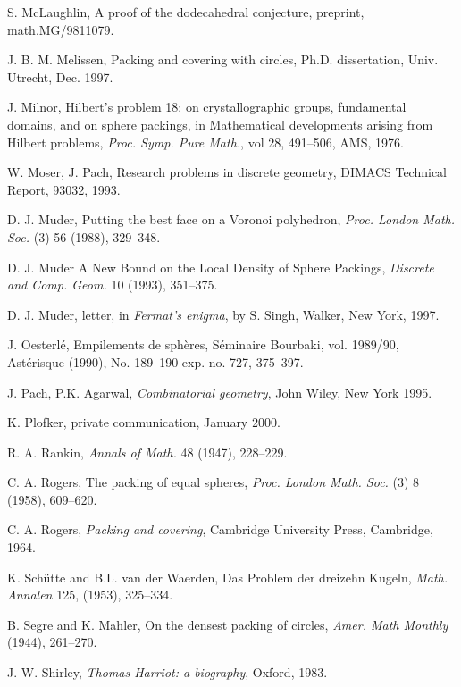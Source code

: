  S. McLaughlin, A proof of the dodecahedral conjecture,
    preprint, math.MG/9811079.

 J. B. M. Melissen, Packing and covering with circles,
    Ph.D. dissertation, Univ. Utrecht, Dec. 1997.

 J. Milnor, Hilbert's problem 18: on crystallographic groups,
    fundamental domains, and on sphere packings, in
    Mathematical developments arising from Hilbert problems,
    {\it Proc. Symp. Pure Math.}, vol 28, 491--506, AMS, 1976.

 W. Moser, J. Pach, Research problems in discrete geometry,
    DIMACS Technical Report, 93032, 1993.

 D. J. Muder, Putting the best face on a Voronoi polyhedron,
    {\it Proc. London Math. Soc.} (3) 56 (1988), 329--348.


  D. J. Muder A New Bound on the Local Density
of Sphere Packings, {\it Discrete and Comp. Geom.} 10 (1993),
351--375.

  D. J. Muder, letter, in {\it Fermat's enigma}, by S. Singh,
        Walker, New York, 1997.

 J. Oesterl\'e,  Empilements de sph\`eres,
    S\'eminaire Bourbaki, vol. 1989/90, Ast\'erisque (1990),
        No. 189--190 exp. no. 727, 375--397.

 J. Pach, P.K. Agarwal, {\it Combinatorial geometry}, John Wiley,
    New York 1995.

  K. Plofker, private communication, January 2000.

 R. A. Rankin, {\it Annals of Math.} 48 (1947), 228--229.

 C. A. Rogers, The packing of equal spheres, {\it Proc. London Math.
    Soc.} (3) 8 (1958), 609--620.

 C. A. Rogers, {\it Packing and covering}, Cambridge University Press,
    Cambridge, 1964.

 K. Sch\"utte and B.L. van der Waerden, Das
Problem der dreizehn Kugeln, {\it Math. Annalen} 125, (1953),
325--334.

 B. Segre and K. Mahler, On the densest packing of
    circles, {\it Amer. Math Monthly} (1944), 261--270.

 J. W. Shirley,
{\it Thomas Harriot: a biography}, Oxford, 1983.

